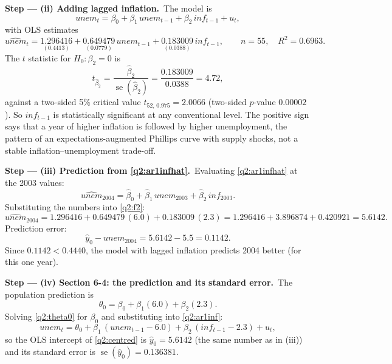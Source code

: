 \documentclass[11pt,a4paper]{article}
\numberwithin{equation}{questao}   %
\newcommand{\passo}[2]{\par\smallskip\noindent\textbf{Step --- #1.}~#2}
\begin{document}
\begin{sol}
\passo{(ii) Adding lagged inflation}{The model is}
\begin{equation}\label{q2:ar1inf}
unem_t=\beta_0+\beta_1\,unem_{t-1}+\beta_2\,inf_{t-1}+u_t ,
\end{equation}
with OLS estimates
\begin{equation}\label{q2:ar1infhat}
\widehat{unem}_t=\underset{(0.4413)}{1.296416}+\underset{(0.0779)}{0.649479}\,unem_{t-1}
+\underset{(0.0388)}{0.183009}\,inf_{t-1},
\qquad n=55,\quad R^2=0.6963 .
\end{equation}
The $t$ statistic for $H_0:\beta_2=0$ is
\begin{equation}\label{q2:t}
t_{\hat\beta_2}=\frac{\hat\beta_2}{\operatorname{se}(\hat\beta_2)}=\frac{0.183009}{0.0388}=4.72 ,
\end{equation}
against a two-sided 5\% critical value $t_{52,\,0.975}=2.0066$ (two-sided $p$-value $0.00002$).
So $inf_{t-1}$ is statistically significant at any conventional level. The positive sign says that
a year of higher inflation is followed by higher unemployment, the pattern of an
expectations-augmented Phillips curve with supply shocks, not a stable inflation--unemployment
trade-off.

\passo{(iii) Prediction from \eqref{q2:ar1infhat}}{Evaluating \eqref{q2:ar1infhat} at the 2003 values:}
\begin{equation}\label{q2:f2}
\widehat{unem}_{2004}=\hat\beta_0+\hat\beta_1\,unem_{2003}+\hat\beta_2\,inf_{2003}.
\end{equation}
Substituting the numbers into \eqref{q2:f2}:
\[
\widehat{unem}_{2004}=1.296416+0.649479\,(6.0)+0.183009\,(2.3)
=1.296416+3.896874+0.420921=5.6142 .
\]
Prediction error:
\[
\hat y_0-unem_{2004}=5.6142-5.5=0.1142 .
\]
Since $0.1142<0.4440$, the model with lagged inflation predicts 2004 better (for this one year).

\passo{(iv) Section 6-4: the prediction and its standard error}{The population prediction is}
\begin{equation}\label{q2:theta0}
\theta_0=\beta_0+\beta_1(6.0)+\beta_2(2.3).
\end{equation}
Solving \eqref{q2:theta0} for $\beta_0$ and substituting into \eqref{q2:ar1inf}:
\begin{equation}\label{q2:centred}
unem_t=\theta_0+\beta_1\,(unem_{t-1}-6.0)+\beta_2\,(inf_{t-1}-2.3)+u_t ,
\end{equation}
so the OLS intercept of \eqref{q2:centred} is $\hat y_0=5.6142$ (the same number as in (iii)) and its
standard error is $\operatorname{se}(\hat y_0)=0.136381$.


\end{sol}
\end{document}
